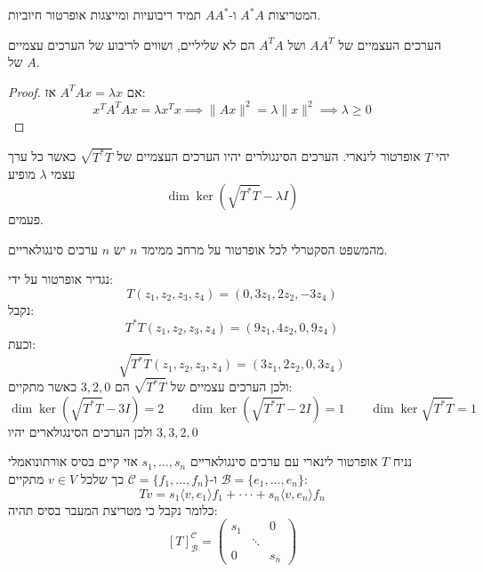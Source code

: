 \documentclass{tstextbook}
\begin{document}
\begin{proposition}
המטריצות \(A^{*}A\) ו-\(AA^{*}\) תמיד ריבועיות ומייצגות אופרטור חיוביות.

\end{proposition}
\begin{proposition}
הערכים העצמיים של \(AA^{T}\) ושל \(A^{T}A\) הם לא שליליים, ושווים לריבוע של הערכים עצמיים של \(A\).

\end{proposition}
\begin{proof}
אם \(A^{T}Ax=\lambda x\) אז:
$$x^{T}A^{T}Ax=\lambda x^{T}x\implies \lVert Ax \rVert ^{2}=\lambda \lVert x \rVert ^{2}\implies \lambda \geq 0$$

\end{proof}
\begin{definition}
יהי \(T\) אופרטור לינארי. הערכים הסינגולרים יהיו הערכים העצמיים של \(\sqrt{  T^{*}T }\) כאשר כל ערך עצמי \(\lambda\) מופיע
$$\dim \ker \left( \sqrt{ T^{*}T} -\lambda I\right)$$
פעמים.

\end{definition}
\begin{corollary}
מהמשפט הסקטרלי לכל אופרטור על מרחב ממימד \(n\) יש \(n\) ערכים סינגולאריים.

\end{corollary}
\begin{example}
נגדיר אופרטור על ידי:
$$T(z_{1},z_{2},z_{3},z_{4})=(0,3z_{1},2z_{2},-3z_{4})$$
נקבל:
$$T^{*}T(z_{1},z_{2},z_{3},z_{4})=(9z_{1},4z_{2},0,9z_{4})$$
וכעת:
$$\sqrt{T^{*}T}(z_{1},z_{2},z_{3},z_{4})=(3z_{1},2z_{2},0,3z_{4})$$
ולכן הערכים עצמיים של \(\sqrt{ T^{*}T }\) הם \(3,2,0\) כאשר מתקיים:
$$\dim\ker\left( \sqrt{T^{*}T}-3I \right)=2\qquad \dim\ker\left( \sqrt{T^{*}T}-2I \right)=1\qquad \dim\ker\sqrt{T^{*}T}=1$$
ולכן הערכים הסינגולארים יהיו \(3,3,2, 0\)

\end{example}
\begin{theorem}
נניח \(T\) אופרטור לינארי עם ערכים סינגולאריים \(s_{1},\dots,s_{n}\) אזי קיים בסיס אורתונואמלי \(\mathcal{B}=\{ e_{1},\dots,e_{n} \}\) ו-\(\mathcal{C}=\{ f_{1},\dots,f_{n} \}\) כך שלכל \(v \in V\) מתקיים:
$$T v=s_{1}\langle v,e_{1}\rangle f_{1}+\cdot\cdot\cdot+s_{n}\langle v,e_{n}\rangle f_{n}$$
כלומר נקבל כי מטריצת המעבר בסיס תהיה:
$$[T]_{\mathcal{B} }^{\mathcal{C} }=\begin{pmatrix}s_{1} &  & 0 \\ & \ddots &  \\0 &  & s_{n}
\end{pmatrix}$$

\end{theorem}
\end{document}
